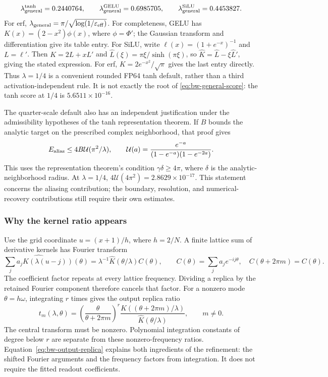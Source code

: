 \[
 \lambda_{\rm general}^{\tanh}=0.2440764,\qquad
 \lambda_{\rm general}^{\rm GELU}=0.6985705,\qquad
 \lambda_{\rm general}^{\rm SiLU}=0.4453827.
\]
For erf, $\lambda_{\rm general}=\pi/\sqrt{\log(1/\varepsilon_{\rm eff})}$.
For completeness, GELU has $K(x)=(2-x^2)\phi(x)$, where $\phi=\Phi'$;
the Gaussian transform and differentiation give its table entry. For SiLU,
write $\ell(x)=(1+e^{-x})^{-1}$ and $L=\ell'$. Then
$K=2L+xL'$ and $\widehat L(\xi)=\pi\xi/\sinh(\pi\xi)$, so
$\widehat K=\widehat L-\xi\widehat L'$, giving the stated expression.
For erf, $K=2e^{-x^2}/\sqrt\pi$ gives the last entry directly.
Thus $\lambda=1/4$ is a convenient rounded FP64 tanh default, rather than a
third activation-independent rule. It is not exactly the root of
\eqref{eq:bw-general-score}: the tanh score at $1/4$ is
$5.6511\times10^{-16}$.

The quarter-scale default also has an independent justification under the
admissibility hypotheses of the tanh representation theorem. If $B$ bounds
the analytic target on the prescribed complex neighborhood, that proof gives
\begin{equation}
 E_{\rm alias}\le4B\mathcal U(\pi^2/\lambda),\qquad
 \mathcal U(a)=\frac{e^{-a}}{(1-e^{-a})(1-e^{-2a})}.
 \label{eq:bw-quarter-class-bound}
\end{equation}
This uses the representation theorem's condition $\gamma\delta\ge4\pi$,
where $\delta$ is the analytic-neighborhood radius.
At $\lambda=1/4$, $4\mathcal U(4\pi^2)=2.8629\times10^{-17}$.
This statement concerns the aliasing contribution; the boundary, resolution,
and numerical-recovery contributions still require their own estimates.

\subsubsection{Why the kernel ratio appears}
\label{app:bw-replicas}

Use the grid coordinate $u=(x+1)/h$, where $h=2/N$. A finite lattice sum of
derivative kernels has Fourier transform
\begin{equation}
 \widehat{\sum_j a_jK(\lambda(u-j))}(\theta)
 =\lambda^{-1}\widehat K(\theta/\lambda)C(\theta),\qquad
 C(\theta)=\sum_j a_je^{-ij\theta},\quad
 C(\theta+2\pi m)=C(\theta).
 \label{eq:bw-lattice-spectrum}
\end{equation}
The coefficient factor repeats at every lattice frequency. Dividing a
replica by the retained Fourier component therefore cancels that factor.
For a nonzero mode $\theta=h\omega$, integrating $r$ times gives the output
replica ratio
\begin{equation}
 t_m(\lambda,\theta)=
 \left(\frac{\theta}{\theta+2\pi m}\right)^r
 \frac{\widehat K((\theta+2\pi m)/\lambda)}
      {\widehat K(\theta/\lambda)},\qquad m\ne0.
 \label{eq:bw-output-replica}
\end{equation}
The central transform must be nonzero. Polynomial integration constants of
degree below $r$ are separate from these nonzero-frequency ratios.
Equation~\eqref{eq:bw-output-replica} explains both ingredients of the
refinement: the shifted Fourier arguments and the frequency factors from
integration. It does not require the fitted readout coefficients.

